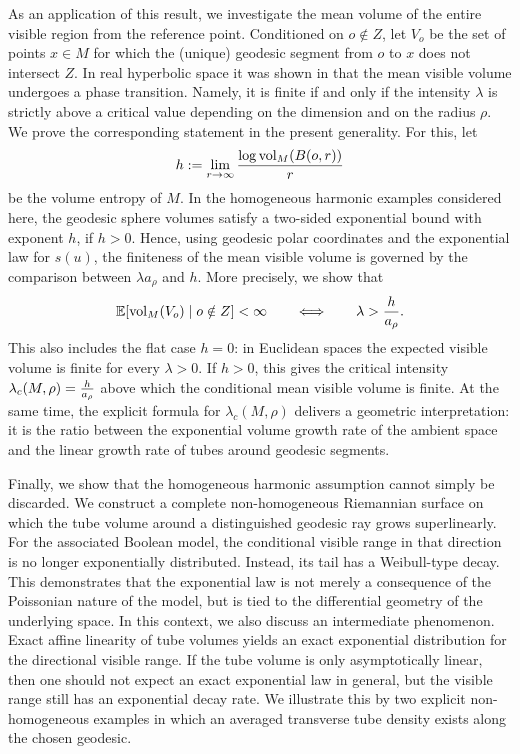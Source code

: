\documentclass[11pt,a4paper]{article}
\theoremstyle{plain}
\theoremstyle{definition}
\theoremstyle{remark}
\newcommand{\vol}{\mathop{\mathrm{vol}}\nolimits}
\def\EE{\mathbb{E}}
\begin{document}
As an application of this result, we investigate the mean volume of the entire visible region from the reference point. Conditioned on \(o\notin Z\), let \(V_o\) be the set of points \(x\in M\) for which the (unique) geodesic segment from \(o\) to \(x\) does not intersect \(Z\). In real hyperbolic space it was shown in \cite{BuehlerHugThaeleBM} that the mean visible volume undergoes a phase transition. Namely, it is finite if and only if the intensity \(\lambda\) is strictly above a critical value depending on the dimension and on the radius \(\rho\). We prove the corresponding statement in the present generality. For this, let
\[
h:=\lim_{r\to\infty}{\log\vol_M(B(o,r))\over r}
\]
be the volume entropy of \(M\). In the homogeneous harmonic examples considered here, the geodesic sphere volumes satisfy a two-sided exponential bound with exponent \(h\), if $h>0$. Hence, using geodesic polar coordinates and the exponential law for \(s(u)\), the finiteness of the mean visible volume is governed by the comparison between \(\lambda a_\rho\) and \(h\). More precisely, we show that
\[
\EE[\vol_M(V_o)\mid o\notin Z]<\infty
\qquad\Longleftrightarrow\qquad
\lambda > {h\over a_\rho}.
\]
This also includes the flat case \(h=0\): in Euclidean spaces the expected visible volume is finite for every \(\lambda>0\). If \(h>0\), this gives the critical intensity $\lambda_c(M,\rho)={h\over a_\rho}$ above which the conditional mean visible volume is finite. At the same time, the explicit formula for $\lambda_c(M,\rho)$ delivers a geometric interpretation: it is the ratio between the exponential volume growth rate of the ambient space and the linear growth rate of tubes around geodesic segments.

Finally, we show that the homogeneous harmonic assumption cannot simply be discarded. We construct a complete non-homogeneous Riemannian surface on which the tube volume around a distinguished geodesic ray grows superlinearly. For the associated Boolean model, the conditional visible range in that direction is no longer exponentially distributed. Instead, its tail has a Weibull-type decay. This demonstrates that the exponential law is not merely a consequence of the Poissonian nature of the model, but is tied to the differential geometry of the underlying space. In this context, we also discuss an intermediate phenomenon. Exact affine linearity of tube volumes yields an exact exponential distribution for the directional visible range. If the tube volume is only asymptotically linear, then one should not expect an exact exponential law in general, but the visible range still has an exponential decay rate. We illustrate this by two explicit non-homogeneous examples in which an averaged transverse tube density exists along the chosen geodesic.
\end{document}

